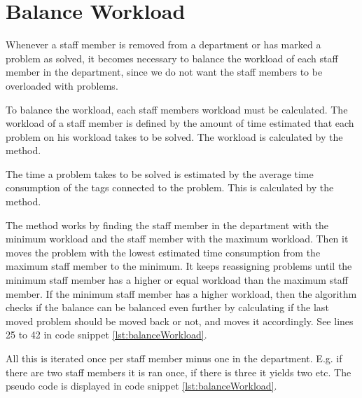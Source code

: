 \section{Balance Workload}
\label{sec:balanceworkload}
Whenever a staff member is removed from a department or has marked a problem as solved, 
it becomes necessary to balance the workload of each staff member in the department, since we do not want the staff members to be overloaded with problems. 

To balance the workload, each staff members workload must be calculated. 
The workload of a staff member is defined by the amount of time estimated that each problem on his workload takes to be solved. 
The workload is calculated by the  method.

The time a problem takes to be solved is estimated by the average time consumption of the tags connected to the problem. 
This is calculated by the  method.

The  method works by finding the staff member in the department with the minimum workload and the staff member with the maximum workload. Then it moves the problem with the lowest estimated time consumption from the maximum staff member to the minimum. 
It keeps reassigning problems until the minimum staff member has a higher or equal workload than the maximum staff member. If the minimum staff member has a higher workload, then the algorithm checks if the balance can be balanced even further by calculating if the last moved problem should be moved back or not, and moves it accordingly. See lines 25 to 42 in code snippet \ref{lst:balanceWorkload}.


All this is iterated once per staff member minus one in the department. 
E.g. if there are two staff members it is ran once, if there is three it yields two etc. 
The pseudo code is displayed in code snippet \ref{lst:balanceWorkload}.

